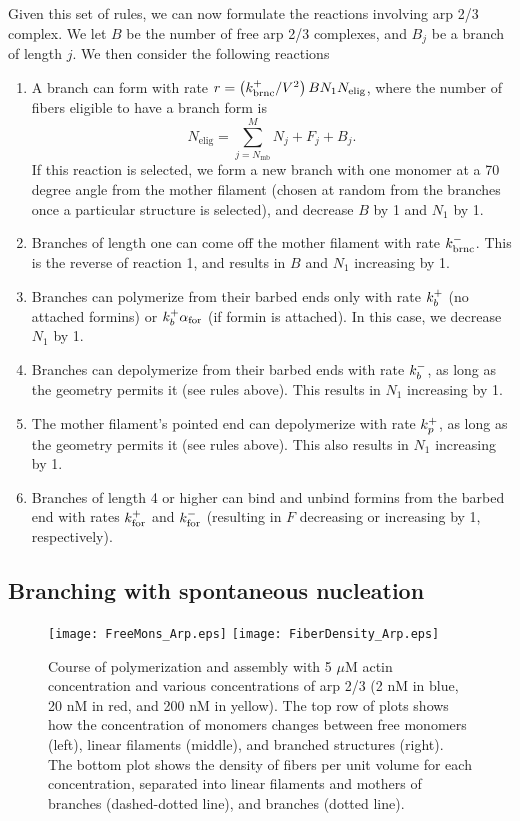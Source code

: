 \documentclass[11pt]{article}
\begin{document}
Given this set of rules, we can now formulate the reactions involving arp 2/3 complex. We let $B$ be the number of free arp 2/3 complexes, and $B_j$ be a branch of length $j$. We then consider the following reactions
\begin{enumerate}
\item A branch can form with rate $r=\left(k_\text{brnc}^+/V^2\right) B N_1 N_\text{elig}$, where the number of fibers eligible to have a branch form is
\begin{equation}
\label{eq:NBElig}
N_\text{elig}=\sum_{j=N_\text{mb}}^M N_j+F_j +B_j.
\end{equation}
If this reaction is selected, we form a new branch with one monomer at a 70 degree angle from the mother filament (chosen at random from the branches once a particular structure is selected), and decrease $B$ by 1 and $N_1$ by 1. 
\item Branches of length one can come off the mother filament with rate $k_\text{brnc}^-$. This is the reverse of reaction 1, and results in $B$ and $N_1$ increasing by 1.
\item Branches can polymerize from their barbed ends only with rate $k_b^+$ (no attached formins) or $k_b^+ \alpha_\text{for}$ (if formin is attached). In this case, we decrease $N_1$ by 1. 
\item Branches can depolymerize from their barbed ends with rate $k_b^-$, as long as the geometry permits it (see rules above). This results in $N_1$ increasing by 1.   
\item The mother filament's pointed end can depolymerize with rate $k_p^+$, as long as the geometry permits it (see rules above). This also results in $N_1$ increasing by 1.   
\item Branches of length 4 or higher can bind and unbind formins from the barbed end with rates $k_\text{for}^+$ and $k_\text{for}^-$ (resulting in $F$ decreasing or increasing by 1, respectively). 
\end{enumerate}

\subsection{Branching with spontaneous nucleation \label{sec:BrSN}}

\begin{figure}
\centering
\texttt{[image: FreeMons\_Arp.eps]}
\texttt{[image: FiberDensity\_Arp.eps]}
\caption{\label{fig:PolyDynamicsArp}Course of polymerization and assembly with 5 $\mu$M actin concentration and various concentrations of arp 2/3 (2 nM in blue, 20 nM in red, and 200 nM in yellow). The top row of plots shows how the concentration of monomers changes between free monomers (left), linear filaments (middle), and branched structures (right). The bottom plot shows the density of fibers per unit volume for each concentration, separated into linear filaments and mothers of branches (dashed-dotted line), and branches (dotted line).  }
\end{figure}
\end{document}
